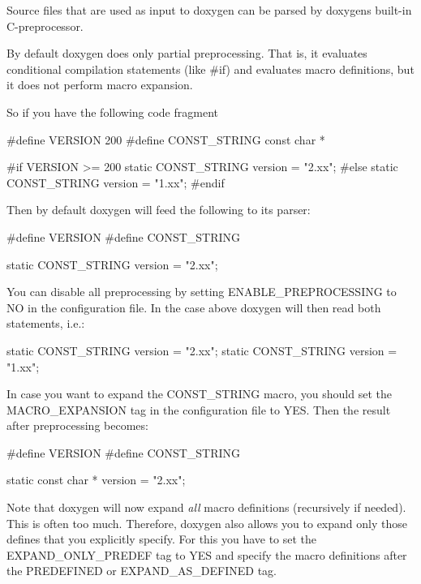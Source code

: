 Source files that are used as input to doxygen can be parsed by doxygen\textquotesingle{}s built-\/in C-\/preprocessor.

By default doxygen does only partial preprocessing. That is, it evaluates conditional compilation statements (like {\ttfamily \#if}) and evaluates macro definitions, but it does not perform macro expansion.

So if you have the following code fragment \begin{DoxyVerb}#define VERSION 200
#define CONST_STRING const char *

#if VERSION >= 200
  static CONST_STRING version = "2.xx";
#else
  static CONST_STRING version = "1.xx";
#endif
\end{DoxyVerb}


Then by default doxygen will feed the following to its parser\+:

\begin{DoxyVerb}#define VERSION
#define CONST_STRING

  static CONST_STRING version = "2.xx";
\end{DoxyVerb}


You can disable all preprocessing by setting E\+N\+A\+B\+L\+E\+\_\+\+P\+R\+E\+P\+R\+O\+C\+E\+S\+S\+I\+NG to {\ttfamily NO} in the configuration file. In the case above doxygen will then read both statements, i.\+e.\+:

\begin{DoxyVerb}  static CONST_STRING version = "2.xx";
  static CONST_STRING version = "1.xx";
\end{DoxyVerb}


In case you want to expand the {\ttfamily C\+O\+N\+S\+T\+\_\+\+S\+T\+R\+I\+NG} macro, you should set the M\+A\+C\+R\+O\+\_\+\+E\+X\+P\+A\+N\+S\+I\+ON tag in the configuration file to {\ttfamily Y\+ES}. Then the result after preprocessing becomes\+:

\begin{DoxyVerb}#define VERSION
#define CONST_STRING

  static const char * version = "2.xx";
\end{DoxyVerb}


Note that doxygen will now expand {\itshape all} macro definitions (recursively if needed). This is often too much. Therefore, doxygen also allows you to expand only those defines that you explicitly specify. For this you have to set the E\+X\+P\+A\+N\+D\+\_\+\+O\+N\+L\+Y\+\_\+\+P\+R\+E\+D\+EF tag to {\ttfamily Y\+ES} and specify the macro definitions after the P\+R\+E\+D\+E\+F\+I\+N\+ED or E\+X\+P\+A\+N\+D\+\_\+\+A\+S\+\_\+\+D\+E\+F\+I\+N\+ED tag.

